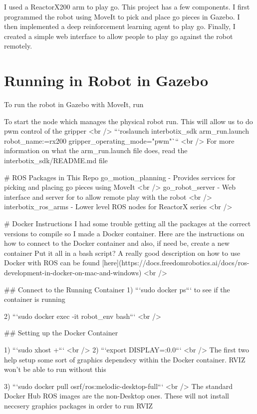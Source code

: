 I used a Reactor\+X200 arm to play go. This project has a few components. I first programmed the robot using Move\+It to pick and place go pieces in Gazebo. I then implemented a deep reinforcement learning agent to play go. Finally, I created a simple web interface to allow people to play go against the robot remotely.

\section*{Running in Robot in Gazebo}

To run the robot in Gazebo with Move\+It, run ~\newline
 
\begin{DoxyCode}
To start the node which manages the physical robot run. This will allow us to do pwm control of the gripper
       <br />
```roslaunch interbotix\_sdk arm\_run.launch robot\_name:=rx200 gripper\_operating\_mode="pwm"``` <br />
For more information on what the arm\_run.launch file does, read the interbotix\_sdk/README.md file

# ROS Packages in This Repo
go\_motion\_planning - Provides services for picking and placing go pieces using MoveIt <br />
go\_robot\_server - Web interface and server for to allow remote play with the robot <br />
interbotix\_ros\_arms - Lower level ROS nodes for ReactorX series <br />


# Docker Instructions
I had some trouble getting all the packages at the correct versions to compile so I made a Docker
       container. Here are the instructions on how to connect to the Docker container and also, if need be, create a new
       container
Put it all in a bash script?
A really good description on how to use Docker with ROS can be found
       [here](https://docs.freedomrobotics.ai/docs/ros-development-in-docker-on-mac-and-windows) <br />

## Connect to the Running Container  
1) ```sudo docker ps``` to see if the container is running

2) ```sudo docker exec -it robot\_env bash``` <br />

## Setting up the Docker Container 

1) ```sudo xhost +``` <br />
2) ```export DISPLAY=:0.0``` <br />
The first two help setup some sort of graphics dependecy within the Docker container. RVIZ won't be able to
       run without this

3) ```sudo docker pull osrf/ros:melodic-desktop-full``` <br />
The standard Docker Hub ROS images are the non-Desktop ones. These will not install neccsery graphics
       packages in order to run RVIZ


\end{DoxyCode}

